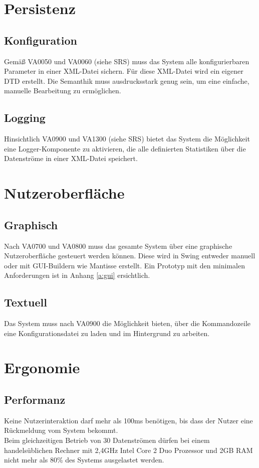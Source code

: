 \section{Persistenz}
\label{sec:6:pers}
\subsection{Konfiguration}
Gemäß VA0050 und VA0060 (siehe SRS) muss das System alle konfigurierbaren
Parameter in einer XML-Datei sichern. Für diese XML-Datei wird ein eigener DTD
erstellt. Die Semanthik muss ausdrucksstark genug sein, um eine einfache,
manuelle Bearbeitung zu ermöglichen.

\subsection{Logging}
Hinsichtlich VA0900 und VA1300 (siehe SRS) bietet das System die Möglichkeit
eine Logger-Komponente zu aktivieren, die alle definierten Statistiken über die
Datenströme in einer XML-Datei speichert.

\section{Nutzeroberfläche}
\label{sec:6:ober}
\subsection{Graphisch}
Nach VA0700 und VA0800 muss das gesamte System über eine graphische
Nutzeroberfläche gesteuert werden können. Diese wird in Swing entweder manuell
oder mit GUI-Buildern wie Mantisse erstellt. Ein Prototyp mit den minimalen
Anforderungen ist in Anhang \ref{a:gui} ersichtlich.

\subsection{Textuell}
Das System muss nach VA0900 die Möglichkeit bieten, über die Kommandozeile eine
Konfigurationsdatei zu laden und im Hintergrund zu arbeiten.

\section{Ergonomie}
\label{sec:6:ergo}
\subsection{Performanz}
Keine Nutzerinteraktion darf mehr als 100ms benötigen, bis dass der Nutzer eine
Rückmeldung vom System bekommt.\\
Beim gleichzeitigen Betrieb von 30 Datenströmen dürfen
bei einem handelsüblichen Rechner mit 2,4GHz Intel Core 2 Duo Prozessor und 2GB RAM nicht mehr als 80\%
des Systems ausgelastet werden.

